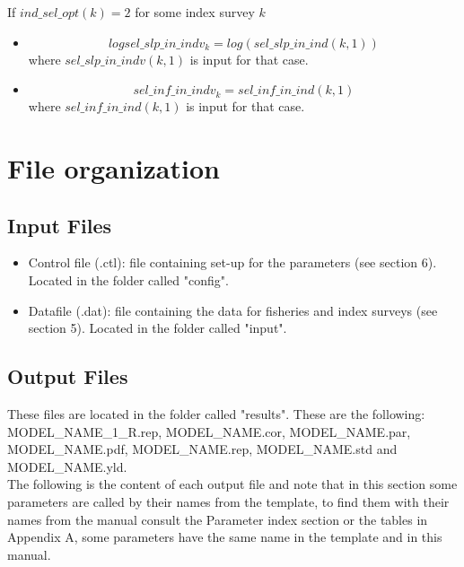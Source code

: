 \documentclass{article}
\begin{document}
If $ind\_sel\_opt(k)=2$ for some index survey $k$
\begin{itemize}
    \item \begin{equation}
    logsel\_slp\_in\_indv_k = log(sel\_slp\_in\_ind(k,1))
\end{equation}
where $sel\_slp\_in\_indv(k,1)$ is input for that case.

\item \begin{equation}
sel\_inf\_in\_indv_k = sel\_inf\_in\_ind(k,1) 
\end{equation}
where $sel\_inf\_in\_ind(k,1)$ is input for that case.
\end{itemize}


\section{File organization}
\subsection{Input Files}
\begin{itemize}
    \item Control file (.ctl): file containing set-up for the parameters (see section 6). Located in the folder called "config".    
    \item Datafile (.dat):  file containing the data for fisheries and index surveys (see section 5). Located in the folder called "input".
\end{itemize}

\subsection{Output Files}
These files are located in the folder called "results". These are the following: MODEL\_NAME\_1\_R.rep, MODEL\_NAME.cor, MODEL\_NAME.par, MODEL\_NAME.pdf, MODEL\_NAME.rep, MODEL\_NAME.std and MODEL\_NAME.yld.  \\ 

The following is the content of each output file and note that in this section some parameters are called by their names from the template, to find them with their names from the manual consult the Parameter index section or the tables in Appendix A, some parameters have the same name in the template and in this manual.
    
\end{document}
